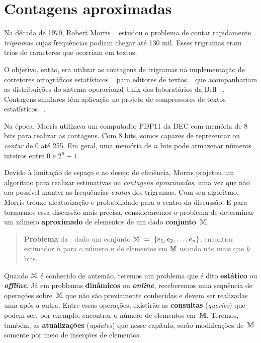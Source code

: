 \chapter{Contagens aproximadas}
\label{chap:morris}


Na década de 1970, Robert Morris ~\citep{morris:78} estudou o problema de contar rapidamente \textit{trigramas} cujas 
frequências podiam chegar até 130 mil. Esses trigramas eram trios de caracteres que ocorriam em textos.

O objetivo, então, era utilizar as contagens de trigramas na implementação de corretores ortográficos estatísticos 
~\citep{morris:lorinda:75} para editores de textos ~\citep{mcmahon:cherry:morris:78} que acompanhariam as distribuições 
do sistema operacional Unix dos laboratórios da Bell ~\citep{lumbroso:2018}. Contagens similares têm aplicação no 
projeto de compressores de textos estatísticos ~\citep{text:compression:1990}.

Na época, Morris utilizava um computador PDP11 da DEC com memória de 8 bits para realizar as contagens. Com 8 bits, 
somos capazes de representar ou \textit{contar} de 0 até 255. Em geral, uma memória de $n$ bits pode armazenar números 
inteiros entre 0 e $2^{n} - 1$.

Devido à limitação de espaço e ao desejo de eficiência, Morris projetou um algoritmo para realizar estimativas ou 
\textit{contagens aproximadas}, uma vez que não era possível manter as frequências \textit{exatas} dos trigramas. Com 
seu algoritmo, Morris trouxe aleatorização e probabilidade para o centro da discussão. E para tornarmos essa discussão 
mais precisa, consideraremos o problema de determinar um número \textbf{aproximado} de elementos de um dado 
\textbf{conjunto}~$\mathbb{M}$. 

\begin{quote}
  \textbf{Problema} da : dado um conjunto $\mathbb{M}~=~\{ e_1, e_2, \dots, e_n \}$, 
  encontrar estimador $\hat{n}$ para o número $n$ de elementos em $\mathbb{M}$ usando não mais que $k$ bits.
\end{quote}

Quando $\mathbb{M}$ é conhecido de antemão, teremos um problema que é dito \textbf{estático} ou \textit{\textbf{offline}}. 
Já em problemas \textbf{dinâmicos} ou \textit{\textbf{online}}, receberemos uma sequência de operações sobre~$\mathbb{M}$ que 
não são previamente conhecidas e devem ser realizadas uma após a outra. Entre essas operações, existirão as 
\textbf{consultas} (\textit{queries}) que podem ser, por exemplo, encontrar o número de elementos em~$\mathbb{M}$. Teremos, 
também, as \textbf{atualizações} (\textit{updates}) que nesse capítulo, serão modificações de~$\mathbb{M}$ somente por meio de 
inserções de elementos.

